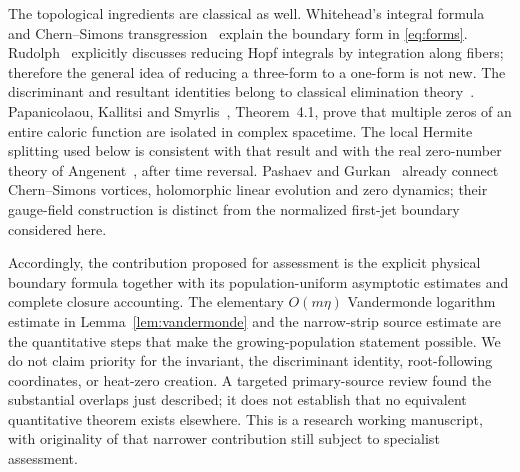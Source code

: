 \documentclass[11pt,letterpaper]{article}
\numberwithin{equation}{section}
\theoremstyle{remark}\newtheorem{remark}[theorem]{Remark}
\begin{document}
The topological ingredients are classical as well. Whitehead's
integral formula~\cite{Whitehead} and Chern--Simons
transgression~\cite{ChernSimons} explain the boundary form in
\eqref{eq:forms}. Rudolph~\cite{Rudolph} explicitly discusses
reducing Hopf integrals by integration along fibers; therefore the
general idea of reducing a three-form to a one-form is not new.
The discriminant and resultant identities belong to classical
elimination theory~\cite{GKZ}. Papanicolaou, Kallitsi and
Smyrlis~\cite{PKS}, Theorem~4.1, prove that multiple zeros of an
entire caloric function are isolated in complex spacetime. The local
Hermite splitting used below is consistent with that result and with
the real zero-number theory of Angenent~\cite{Angenent}, after time
reversal. Pashaev and Gurkan~\cite{PashaevGurkan} already connect
Chern--Simons vortices, holomorphic linear evolution and zero dynamics;
their gauge-field construction is distinct from the normalized
first-jet boundary considered here.

Accordingly, the contribution proposed for assessment is the explicit
physical boundary formula together with its population-uniform
asymptotic estimates and complete closure accounting. The elementary
$O(m\eta)$ Vandermonde logarithm estimate in
Lemma~\ref{lem:vandermonde} and the narrow-strip source estimate are
the quantitative steps that make the growing-population statement
possible. We do not claim priority for the invariant, the
discriminant identity, root-following coordinates, or heat-zero
creation. A targeted primary-source review found the substantial
overlaps just described; it does not establish that no equivalent
quantitative theorem exists elsewhere. This is a research working
manuscript, with originality of that narrower contribution still
subject to specialist assessment.





\end{document}

